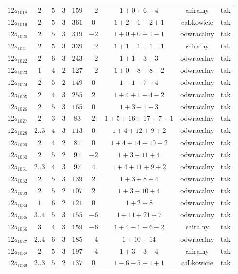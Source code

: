 \begin{longtable}{ccccccccc}
$12a_{1018}$ & $2$ & $5$ & $3$ & $159$ & $-2$ & $1+0+6+4$ & chiralny & tak \\
$12a_{1019}$ & $2$ & $5$ & $3$ & $361$ & $0$ & $1+2-1-2+1$ & caLkowicie & tak \\
$12a_{1020}$ & $2$ & $5$ & $3$ & $319$ & $-2$ & $1+0+0+1-1$ & odwracalny & tak \\
$12a_{1021}$ & $2$ & $5$ & $3$ & $339$ & $-2$ & $1+1-1+1-1$ & chiralny & tak \\
$12a_{1022}$ & $2$ & $6$ & $3$ & $243$ & $-2$ & $1+1-3+3$ & odwracalny & tak \\
$12a_{1023}$ & $1$ & $4$ & $2$ & $127$ & $-2$ & $1+0-8-8-2$ & odwracalny & tak \\
$12a_{1024}$ & $2$ & $5$ & $2$ & $149$ & $0$ & $1-1-7-4$ & odwracalny & tak \\
$12a_{1025}$ & $2$ & $4$ & $3$ & $255$ & $2$ & $1+4+1-4-2$ & odwracalny & tak \\
$12a_{1026}$ & $2$ & $5$ & $3$ & $165$ & $0$ & $1+3-1-3$ & odwracalny & tak \\
$12a_{1027}$ & $2$ & $3$ & $3$ & $83$ & $2$ & $1+5+16+17+7+1$ & odwracalny & tak \\
$12a_{1028}$ & $2..3$ & $4$ & $3$ & $113$ & $0$ & $1+4+12+9+2$ & odwracalny & tak \\
$12a_{1029}$ & $2$ & $4$ & $2$ & $81$ & $0$ & $1+4+14+10+2$ & odwracalny & tak \\
$12a_{1030}$ & $2$ & $5$ & $2$ & $91$ & $-2$ & $1+3+11+4$ & odwracalny & tak \\
$12a_{1031}$ & $2..3$ & $4$ & $3$ & $97$ & $4$ & $1+4+11+9+2$ & odwracalny & tak \\
$12a_{1032}$ & $2$ & $5$ & $3$ & $139$ & $2$ & $1+3+8+4$ & odwracalny & tak \\
$12a_{1033}$ & $2$ & $5$ & $2$ & $107$ & $2$ & $1+3+10+4$ & odwracalny & tak \\
$12a_{1034}$ & $1$ & $6$ & $2$ & $121$ & $0$ & $1+2+8$ & odwracalny & tak \\
$12a_{1035}$ & $3..4$ & $5$ & $3$ & $155$ & $-6$ & $1+11+21+7$ & odwracalny & tak \\
$12a_{1036}$ & $3$ & $4$ & $3$ & $159$ & $-6$ & $1+4-1-6-2$ & chiralny & tak \\
$12a_{1037}$ & $2..4$ & $6$ & $3$ & $185$ & $-4$ & $1+10+14$ & odwracalny & tak \\
$12a_{1038}$ & $2$ & $5$ & $3$ & $197$ & $-4$ & $1+3-3-4$ & chiralny & tak \\
$12a_{1039}$ & $2..3$ & $5$ & $2$ & $137$ & $0$ & $1-6-5+1+1$ & caLkowicie & tak \\

\end{longtable}
